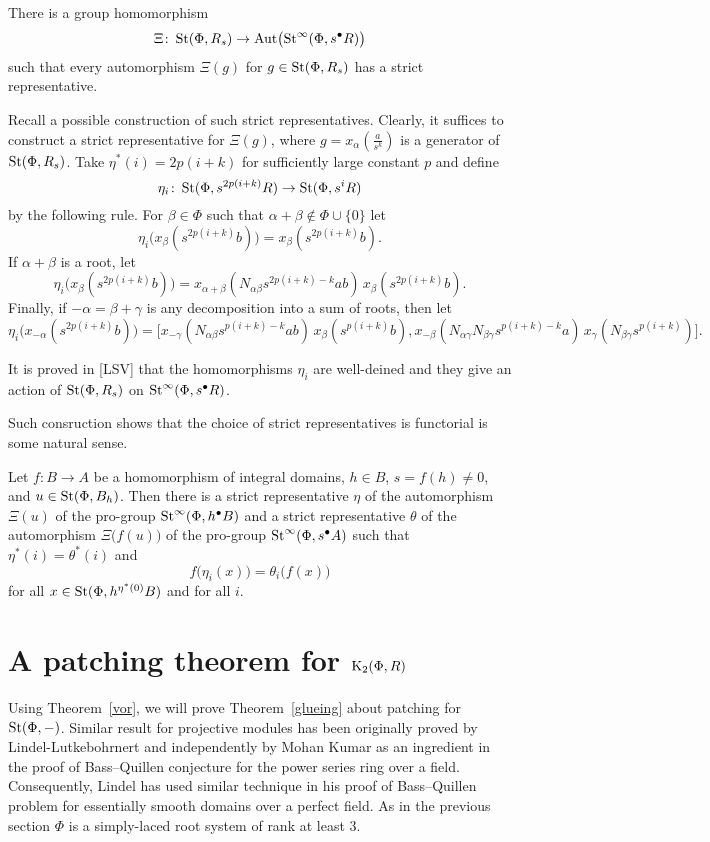 \documentclass[oneside, 11pt]{amsart} \pdfoutput=1
\begin{document}
\begin{theorem}[Voronetsky]
\label{vor}
There is a group homomorphism 
$$
\Xi \colon \mathop{\mathrm{St}}\nolimits(\Phi, R_s) \to \mathrm{Aut}\bigl(\mathop{\mathrm{St}}\nolimits^\infty(\Phi, s^\bullet R)\bigr)
$$
such that every automorphism $\Xi(g)$ for $g \in \mathop{\mathrm{St}}\nolimits(\Phi, R_s)$ has a strict representative.
\end{theorem}

Recall a possible construction of such strict representatives. Clearly, it suffices to construct a strict representative for \(\Xi(g)\), where $g = x_\alpha(\frac a {s^k})$ is a generator of $\mathop{\mathrm{St}}\nolimits(\Phi, R_s)$. Take $\eta^*(i) = 2p(i + k)$ for sufficiently large constant \(p\) and define
$$
\eta_i \colon \mathop{\mathrm{St}}\nolimits(\Phi, s^{2p(i + k)} R) \to \mathop{\mathrm{St}}\nolimits(\Phi, s^i R)
$$
by the following rule. For $\beta \in \Phi$ such that \(\alpha + \beta \notin \Phi \cup \{0\}\) let 
$$\eta_i \bigl(x_\beta(s^{2p(i + k)} b)\bigr) = x_\beta(s^{2p(i + k)}b).$$
If $\alpha + \beta$ is a root, let
$$
\eta_i\bigl(x_\beta(s^{2p(i + k)} b)\bigr) = x_{\alpha + \beta}(N_{\alpha \beta} s^{2p(i + k) - k} ab)\, x_\beta(s^{2p(i + k)} b).
$$
Finally, if $-\alpha = \beta + \gamma$ is any decomposition into a sum of roots, then let
$$
\eta_i\bigl(x_{-\alpha}(s^{2p(i + k)} b)\bigr) = \bigl[x_{-\gamma}(N_{\alpha\beta} s^{p(i + k) - k} ab)\,
x_\beta(s^{p(i + k)} b),
x_{-\beta}(N_{\alpha\gamma} N_{\beta\gamma} s^{p(i + k) - k} a)\,
x_\gamma(N_{\beta \gamma} s^{p(i + k)})\bigr].
$$

It is proved in [LSV] that the homomorphisms $\eta_i$ are well-deined and they give an action of $\mathop{\mathrm{St}}\nolimits(\Phi, R_s)$ on $\mathop{\mathrm{St}}\nolimits^\infty(\Phi, s^\bullet R)$.

Such consruction shows that the choice of strict representatives is functorial is some natural sense. 
\begin{corollary}
\label{vorcor}
Let $f \colon B \to A$ be a homomorphism of integral domains, $h \in B$, $s = f(h) \neq 0$, and $u \in \mathop{\mathrm{St}}\nolimits(\Phi, B_h)$. Then there is a strict representative $\eta$ of the automorphism $\Xi(u)$ of the pro-group $\mathop{\mathrm{St}}\nolimits^\infty(\Phi, h^\bullet B)$ and a strict representative $\theta$ of the automorphism $\Xi\bigl(f(u)\bigr)$ of the pro-group $\mathop{\mathrm{St}}\nolimits^\infty(\Phi, s^\bullet A)$ such that $\eta^*(i) = \theta^*(i)$ and
$$f\bigl(\eta_i(x)\bigr) = \theta_i\bigl(f(x)\bigr)$$
for all $x \in \mathop{\mathrm{St}}\nolimits(\Phi, h^{\eta^*(0)}B)$ and for all \(i\).
\end{corollary}

\section{A patching theorem for \texorpdfstring{${\mathrm{K}}_2(\Phi, R)$}{K2(Ф,R)}}
Using Theorem~\ref{vor}, we will prove Theorem~\ref{glueing} about patching for $\mathop{\mathrm{St}}\nolimits(\Phi,-)$. 
Similar result for projective modules has been originally proved by Lindel-Lutkebohrnert and independently by Mohan Kumar as an ingredient in the proof of Bass--Quillen conjecture for the power series ring over a field. 
Consequently, Lindel has used similar technique in his proof of Bass--Quillen problem for essentially smooth domains over a perfect field.
As in the previous section $\Phi$ is a simply-laced root system of rank at least $3$.
\end{document}
